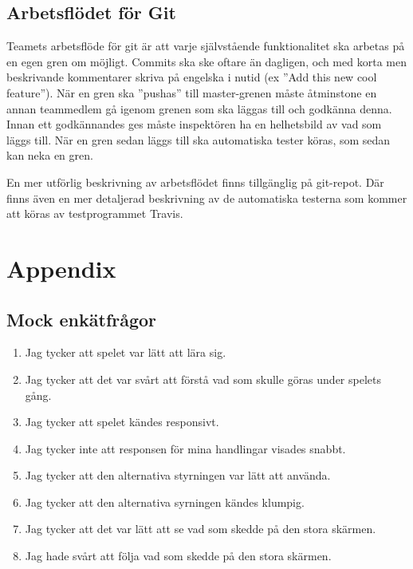 \documentclass[10pt]{article}
\begin{document}
	\subsection{Arbetsflödet för Git}
	Teamets arbetsflöde för git är att varje självstående funktionalitet ska arbetas på en egen gren om möjligt. Commits ska ske oftare än dagligen, och med korta men beskrivande kommentarer skriva på engelska i nutid (ex ''Add this new cool feature''). När en gren ska ''pushas'' till master-grenen måste åtminstone en annan teammedlem gå igenom grenen som ska läggas till och godkänna denna. Innan ett godkännandes ges måste inspektören ha en helhetsbild av vad som läggs till. När en gren sedan läggs till ska automatiska tester köras, som sedan kan neka en gren.
	
	En mer utförlig beskrivning av arbetsflödet finns tillgänglig på git-repot. Där finns även en mer detaljerad beskrivning av de automatiska testerna som kommer att köras av testprogrammet Travis.
	
\pagebreak
\section*{Appendix}
	\subsection*{Mock enkätfrågor}
	\begin{enumerate}
		\item Jag tycker att spelet var lätt att lära sig. 
		\item Jag tycker att det var svårt att förstå vad som skulle göras under spelets gång.
		\item Jag tycker att spelet kändes responsivt.
		\item Jag tycker inte att responsen för mina handlingar visades snabbt.
		\item Jag tycker att den alternativa styrningen var lätt att använda.
		\item Jag tycker att den alternativa syrningen kändes klumpig.
		\item Jag tycker att det var lätt att se vad som skedde på den stora skärmen.
		\item Jag hade svårt att följa vad som skedde på den stora skärmen.
		
	\end{enumerate}




	
\pagebreak

\printbibliography
{}
\end{document}
